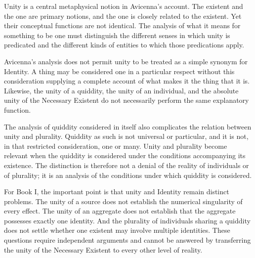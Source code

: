 Unity is a central metaphysical
notion in Avicenna's account.
The existent and the one
are primary notions, and
the one is closely related
to the existent. Yet
their conceptual functions
are not identical. The
analysis of what it means
for something to be one
must distinguish the
different senses in which
unity is predicated and
the different kinds of
entities to which those
predications apply.
\citep[Ilahiyyat, I.5 and III.2--3]{AvicennaMetaphysics}

\label{para:VS.B01.P01.C08.S13.SS09.P002}

Avicenna's analysis does
not permit unity to be
treated as a simple
synonym for Identity.
A thing may be considered
one in a particular
respect without this
consideration supplying
a complete account of
what makes it the thing
that it is. Likewise,
the unity of a quiddity,
the unity of an individual,
and the absolute unity
of the Necessary Existent
do not necessarily perform
the same explanatory
function.
\citep[Ilahiyyat, III.2--3 and V.1]{AvicennaMetaphysics}

\label{para:VS.B01.P01.C08.S13.SS09.P003}

The analysis of quiddity
considered in itself
also complicates the
relation between unity
and plurality. Quiddity
as such is not universal
or particular, and it
is not, in that restricted
consideration, one or
many. Unity and plurality
become relevant when
the quiddity is considered
under the conditions
accompanying its existence.
The distinction is therefore
not a denial of the
reality of individuals
or of plurality; it
is an analysis of the
conditions under which
quiddity is considered.
\citep[Ilahiyyat, V.1--2]{AvicennaMetaphysics}

\label{para:VS.B01.P01.C08.S13.SS09.P004}

For Book I, the important
point is that unity and
Identity remain distinct
problems. The unity of
a source does not establish
the numerical singularity
of every effect. The
unity of an aggregate
does not establish that
the aggregate possesses
exactly one identity.
And the plurality of
individuals sharing
a quiddity does not
settle whether one
existent may involve
multiple identities.
These questions require
independent arguments
and cannot be answered
by transferring the
unity of the Necessary
Existent to every other
level of reality.

\label{para:VS.B01.P01.C08.S13.SS09.P005}


